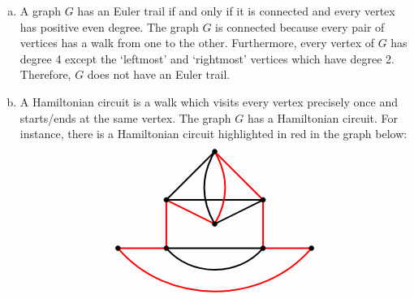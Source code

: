 \documentclass[11pt,letterpaper]{article}
\begin{document}
\sol 
\begin{enumerate}[(a)]
\item A graph $G$ has an Euler trail if and only if it is connected and every vertex has positive even degree. The graph $G$ is connected because every pair of vertices has a walk from one to the other. Furthermore, every vertex of $G$ has degree 4 except the `leftmost' and `rightmost' vertices which have degree 2. Therefore, $G$ does not have an Euler trail. \pspace

\item A Hamiltonian circuit is a walk which visits every vertex precisely once and starts/ends at the same vertex. The graph $G$ has a Hamiltonian circuit. For instance, there is a Hamiltonian circuit highlighted in red in the graph below:
	\[
	\begin{tikzpicture}[scale=1.5]
	\draw[line width=0.05cm,red] (-2,0) -- (-1,0);
	\draw[line width=0.05cm] (-1,0) -- (1,0);
	\draw[line width=0.05cm,red] (1,0) -- (2,0);
	\draw[line width=0.05cm,red] (-1,0) to (-1,1);
	\draw[line width=0.05cm,red] (1,0) to (1,1);
	\draw[line width=0.05cm] (-1,1) to (1,1);
	\draw[line width=0.05cm] (-1,1) to (0,2);
	\draw[line width=0.05cm,red] (1,1) to (0,2);
	\draw[line width=0.05cm,red] (-1,1) to (0,0.5);
	\draw[line width=0.05cm] (1,1) to (0,0.5);
	\draw[line width=0.05cm, bend right=50] (-1,0) to (1,0);
	\draw[line width=0.05cm, bend right=50,red] (-2,0) to (2,0);
	\draw[line width=0.05cm, bend right= 30] (0,2) to (0,0.5);
	\draw[line width=0.05cm, bend left= 30,red] (0,2) to (0,0.5);
	
	\draw[fill= black] (0,2) circle (0.05);
	\draw[fill= black] (-1,1) circle (0.05);
	\draw[fill= black] (1,1) circle (0.05);
	\draw[fill= black] (0,0.5) circle (0.05);
	\draw[fill= black] (-2,0) circle (0.05);
	\draw[fill= black] (-1,0) circle (0.05);
	\draw[fill= black] (1,0) circle (0.05);
	\draw[fill= black] (2,0) circle (0.05);
	\end{tikzpicture}
	\]
\end{enumerate}





\newpage
\end{document}
